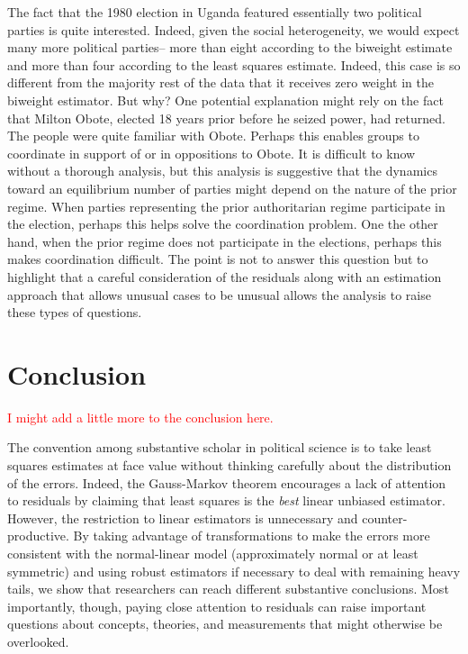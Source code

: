 \documentclass[12pt]{article}
\newcommand{\ctk}[1]{\textcolor{red}{#1}}
\begin{document}
The fact that the 1980 election in Uganda featured essentially two political parties is quite interested. Indeed, given the social heterogeneity, we would expect many more political parties-- more than eight according to the biweight estimate and more than four according to the least squares estimate. 
Indeed, this case is so different from the majority rest of the data that it receives zero weight in the biweight estimator. 
But why? 
One potential explanation might rely on the fact that Milton Obote, elected 18 years prior before he seized power, had returned. 
The people were quite familiar with Obote. 
Perhaps this enables groups to coordinate in support of or in oppositions to Obote. 
It is difficult to know without a thorough analysis, but this analysis is suggestive that the dynamics toward an equilibrium number of parties might depend on the nature of the prior regime. 
When parties representing the prior authoritarian regime participate in the election, perhaps this helps solve the coordination problem. 
One the other hand, when the prior regime does not participate in the elections, perhaps this makes coordination difficult. 
The point is not to answer this question but to highlight that a careful consideration of the residuals along with an estimation approach that allows unusual cases to be unusual allows the analysis to raise these types of questions.

\section*{Conclusion}

\ctk{I might add a little more to the conclusion here.}

The convention among substantive scholar in political science is to take least squares estimates at face value without thinking carefully about the distribution of the errors. 
Indeed,  the Gauss-Markov theorem encourages a lack of attention to residuals by claiming that least squares is the \textit{best} linear unbiased estimator. 
However, the restriction to linear estimators is unnecessary and counter-productive. 
By taking advantage of transformations to make the errors more consistent with the normal-linear model (approximately normal or at least symmetric) and using robust estimators if necessary to deal with remaining heavy tails, we show that researchers can reach different substantive conclusions. 
Most importantly, though, paying close attention to residuals can raise important questions about concepts, theories, and measurements that might otherwise be overlooked. 
\end{document}
